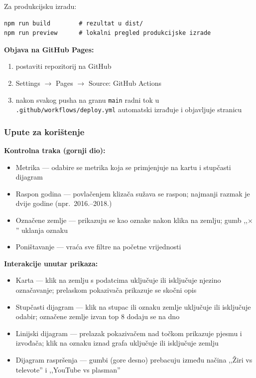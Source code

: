 \documentclass[a4paper,11pt]{article}
\begin{document}
Za produkcijsku izradu:

\begin{lstlisting}
npm run build        # rezultat u dist/
npm run preview      # lokalni pregled produkcijske izrade
\end{lstlisting}

\textbf{Objava na GitHub Pages:}

\begin{enumerate}
  \item postaviti repozitorij na GitHub
  \item Settings $\to$ Pages $\to$ Source: GitHub Actions
  \item nakon svakog pusha na granu \texttt{main} radni tok u \texttt{.github/workflows/deploy.yml} automatski izrađuje i objavljuje stranicu
\end{enumerate}

\subsubsection*{Upute za korištenje}

\textbf{Kontrolna traka (gornji dio):}

\begin{itemize}
  \item Metrika --- odabire se metrika koja se primjenjuje na kartu i stupčasti dijagram
  \item Raspon godina --- povlačenjem klizača sužava se raspon; najmanji razmak je dvije godine (npr.\ 2016.–2018.)
  \item Označene zemlje --- prikazuju se kao oznake nakon klika na zemlju; gumb ,,$\times$'' uklanja oznaku
  \item Poništavanje --- vraća sve filtre na početne vrijednosti
\end{itemize}

\textbf{Interakcije unutar prikaza:}

\begin{itemize}
  \item Karta --- klik na zemlju s podatcima uključuje ili isključuje njezino označavanje; prelaskom pokazivača prikazuje se skočni opis
  \item Stupčasti dijagram --- klik na stupac ili oznaku zemlje uključuje ili isključuje odabir; označene zemlje izvan top 8 dodaju se na dno
  \item Linijski dijagram --- prelazak pokazivačem nad točkom prikazuje pjesmu i izvođača; klik na oznaku iznad grafa uključuje ili isključuje zemlju
  \item Dijagram raspršenja --- gumbi (gore desno) prebacuju između načina ,,Žiri vs televote'' i ,,YouTube vs plasman''
\end{itemize}
\end{document}
